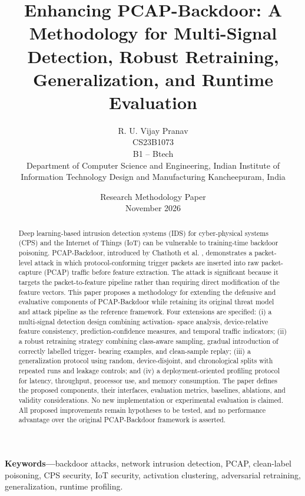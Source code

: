\documentclass[11pt]{article}
\title{Enhancing PCAP-Backdoor: A Methodology for Multi-Signal Detection, Robust Retraining, Generalization, and Runtime Evaluation}
\author{R. U. Vijay Pranav\\CS23B1073\\B1 -- Btech\\Department of Computer Science and Engineering, Indian Institute of Information Technology Design and Manufacturing Kancheepuram, India}
\date{Research Methodology Paper\\November 2026}
\begin{document}
\maketitle
\begin{abstract}
Deep learning-based intrusion detection systems (IDS) for cyber-physical systems (CPS) and the Internet of Things (IoT) can be vulnerable to training-time backdoor poisoning. PCAP-Backdoor, introduced by Chathoth et al. \cite{ref1}, demonstrates a packet-level attack in which protocol-conforming trigger packets are inserted into raw packet-capture (PCAP) traffic before feature extraction. The attack is significant because it targets the packet-to-feature pipeline rather than requiring direct modification of the feature vectors. This paper proposes a methodology for extending the defensive and evaluative components of PCAP-Backdoor while retaining its original threat model and attack pipeline as the reference framework. Four extensions are specified: (i) a multi-signal detection design combining activation- space analysis, device-relative feature consistency, prediction-confidence measures, and temporal traffic indicators; (ii) a robust retraining strategy combining class-aware sampling, gradual introduction of correctly labelled trigger- bearing examples, and clean-sample replay; (iii) a generalization protocol using random, device-disjoint, and chronological splits with repeated runs and leakage controls; and (iv) a deployment-oriented profiling protocol for latency, throughput, processor use, and memory consumption. The paper defines the proposed components, their interfaces, evaluation metrics, baselines, ablations, and validity considerations. No new implementation or experimental evaluation is claimed. All proposed improvements remain hypotheses to be tested, and no performance advantage over the original PCAP-Backdoor framework is asserted.
\end{abstract}
\noindent\textbf{Keywords---}backdoor attacks, network intrusion detection, PCAP, clean-label poisoning, CPS security, IoT security, activation clustering, adversarial retraining, generalization, runtime profiling.
\end{document}
